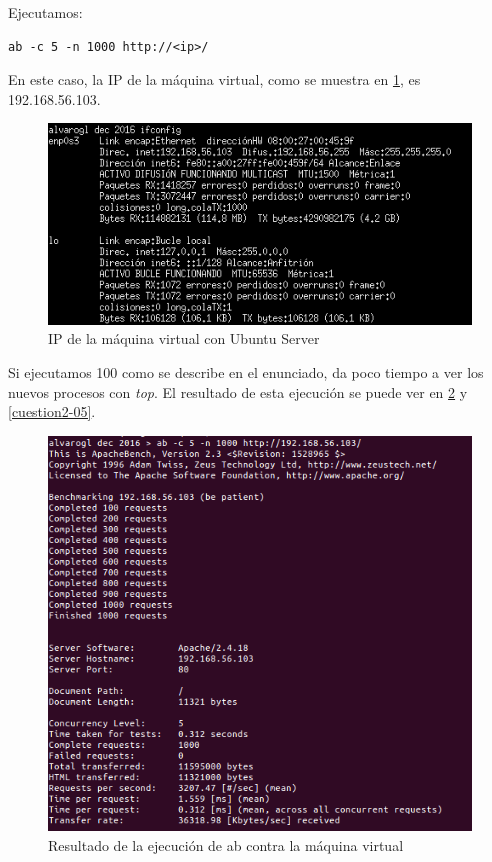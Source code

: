 Ejecutamos:

\begin{verbatim}
ab -c 5 -n 1000 http://<ip>/
\end{verbatim}

En este caso, la IP de la máquina virtual, como se muestra en \ref{cuestion2-07}, es 192.168.56.103.

\begin{figure}[H]
	\centering
	\includegraphics[scale=0.6]{cuestion2-07.png}
	\caption{IP de la máquina virtual con Ubuntu Server} \label{cuestion2-07}
\end{figure}

Si ejecutamos 100 como se describe en el enunciado, da poco tiempo a ver los nuevos procesos con \textit{top}. El resultado de esta ejecución se puede ver en \ref{cuestion2-04} y \ref{cuestion2-05}.

\begin{figure}[H]
	\centering
	\includegraphics[scale=0.5]{cuestion2-04.png}
	\caption{Resultado de la ejecución de ab contra la máquina virtual} \label{cuestion2-04}
\end{figure}


